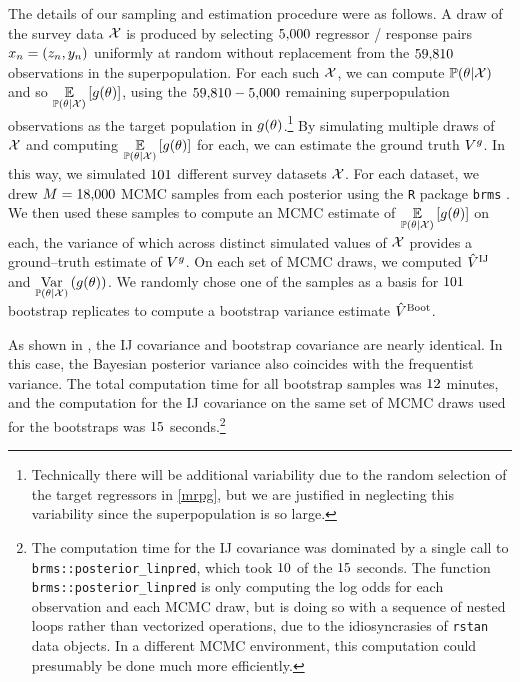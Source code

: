 The details of our sampling and estimation procedure were as follows.  A draw of
the survey data ${\mathcal{X}}$ is produced by selecting $5{,}000$ regressor / response
pairs $x_n = (z_n, y_n)$ uniformly at random without replacement from the
$59{,}810$ observations in the superpopulation.  For each such ${\mathcal{X}}$, we
can compute $\mathbb{P}(\theta | {\mathcal{X}})$ and so $\underset{\mathbb{P}(\theta | {\mathcal{X}})}{\mathbb{E}}\left[g(\theta)\right]$, using the
$59{,}810 - 5{,}000$ remaining superpopulation observations as the target
population in $g(\theta)$.\footnote{Technically there will be additional
variability due to the random selection of the target regressors in
\eqref{mrpg}, but we are justified in neglecting this variability since the
superpopulation is so large.} By simulating multiple draws of ${\mathcal{X}}$ and
computing $\underset{\mathbb{P}(\theta | {\mathcal{X}})}{\mathbb{E}}\left[g(\theta)\right]$ for each, we can estimate the ground
truth $V^g$.   In this way, we simulated $101$ different survey
datasets ${\mathcal{X}}$.  For each dataset, we drew $M=18{,}000$ MCMC samples from
each posterior using the \texttt{R} package \texttt{brms}
\citep{burkner:2018:brms}. We then used these samples to compute an MCMC
estimate of $\underset{\mathbb{P}(\theta | {\mathcal{X}})}{\mathbb{E}}\left[g(\theta)\right]$ on each, the variance of which across
distinct simulated values of ${\mathcal{X}}$ provides a ground--truth estimate of
$V^g$.  On each set of MCMC draws, we computed $\hat{V}^{\mathrm{IJ}}$ and
$\underset{\mathbb{P}(\theta | {\mathcal{X}})}{\mathrm{Var}}\left(g(\theta)\right)$.  We randomly chose one of the samples as a basis for
$101$ bootstrap replicates to compute a bootstrap variance estimate
$\hat{V}^{\mathrm{Boot}}$.

\MRPGraph{}

As shown in , the IJ covariance and bootstrap covariance are
nearly identical.  In this case, the Bayesian posterior variance also coincides
with the frequentist variance.  The total computation time for all bootstrap
samples was $12$ minutes, and the computation for the IJ covariance
on the same set of MCMC draws used for the bootstraps was $15$
seconds.\footnote{ The computation time for the IJ covariance was dominated by a
single call to \texttt{brms::posterior\_linpred}, which took $10$ of
the $15$ seconds. The function \texttt{brms::posterior\_linpred} is only
computing the log odds for each observation and each MCMC draw, but is doing so
with a sequence of nested loops rather than vectorized operations, due to the
idiosyncrasies of \texttt{rstan} data objects.  In a different MCMC environment,
this computation could presumably be done much more efficiently.}

